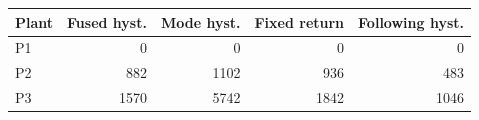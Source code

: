 \begin{tabular}{lrrrr}
\toprule
Plant & Fused hyst. & Mode hyst. & Fixed return & Following hyst. \\
\midrule
P1 & 0 & 0 & 0 & 0 \\
P2 & 882 & 1102 & 936 & 483 \\
P3 & 1570 & 5742 & 1842 & 1046 \\
\bottomrule
\end{tabular}
